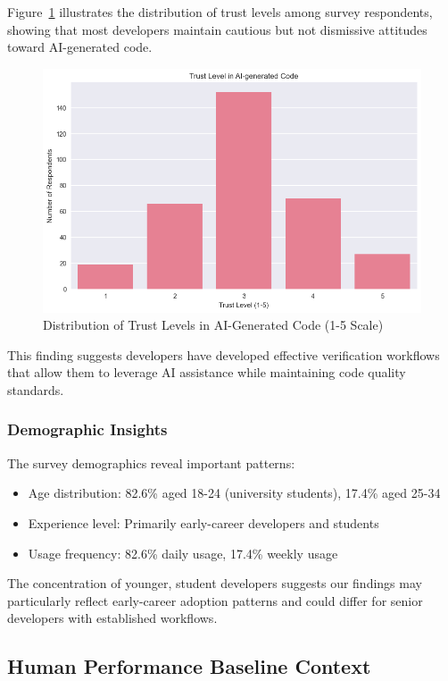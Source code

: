 \documentclass[conference]{IEEEtran}
\begin{document}
Figure~\ref{fig:trust_distribution} illustrates the distribution of trust levels among survey respondents, showing that most developers maintain cautious but not dismissive attitudes toward AI-generated code.

\begin{figure}[htbp]
\centering
\includegraphics[width=0.75\linewidth]{images/survey/trust_level_in_ai_generated.png}
\caption{Distribution of Trust Levels in AI-Generated Code (1-5 Scale)}
\label{fig:trust_distribution}
\end{figure}

This finding suggests developers have developed effective verification workflows that allow them to leverage AI assistance while maintaining code quality standards.

\subsubsection{Demographic Insights}

The survey demographics reveal important patterns:

\begin{itemize}
    \item Age distribution: 82.6\% aged 18-24 (university students), 17.4\% aged 25-34
    \item Experience level: Primarily early-career developers and students
    \item Usage frequency: 82.6\% daily usage, 17.4\% weekly usage
\end{itemize}

The concentration of younger, student developers suggests our findings may particularly reflect early-career adoption patterns and could differ for senior developers with established workflows.

\subsection{Human Performance Baseline Context}
\end{document}
